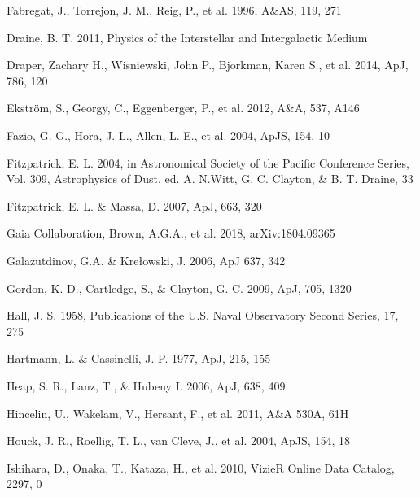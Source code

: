 \documentclass[tradiabstract]{aa} %
\begin{document}
\begin{thebibliography}{}
\item[] Fabregat, J., Torrejon, J. M., Reig, P., et al. 1996, A\&AS, 119, 271

\item[] Draine, B. T. 2011, Physics of the Interstellar and
  Intergalactic Medium

\item[] Draper, Zachary H., Wisniewski, John P., Bjorkman, Karen S., et al. 2014, ApJ, 786, 120

\item[] Ekstr\"om, S., Georgy, C., Eggenberger, P., et al. 2012, A\&A, 537, A146

\item[] Fazio, G. G., Hora, J. L., Allen, L. E., et al. 2004, ApJS, 154, 10

\item[] Fitzpatrick, E. L. 2004, in Astronomical Society of the
  Pacific Conference Series, Vol. 309, Astrophysics of Dust,
  ed. A. N.Witt, G. C. Clayton, \& B. T. Draine, 33

\item[] Fitzpatrick, E. L. \& Massa, D. 2007, ApJ, 663, 320
  
\item[] Gaia Collaboration, Brown, A.G.A., et al. 2018, arXiv:1804.09365

\item[] Galazutdinov, G.A. \& Kre{\l}owski, J. 2006,  ApJ 637,  342 
    
\item[] Gordon, K. D., Cartledge, S., \& Clayton, G. C. 2009, ApJ, 705, 1320

\item[] Hall, J. S. 1958, Publications of the U.S. Naval Observatory Second
Series, 17, 275

\item[] Hartmann, L. \& Cassinelli, J. P. 1977, ApJ, 215, 155

\item[] Heap, S. R., Lanz, T., \& Hubeny I. 2006, ApJ, 638, 409

\item[] Hincelin, U., Wakelam, V., Hersant, F., et al. 2011, A\&A 530A, 61H


\item[] Houck, J. R., Roellig, T. L., van Cleve, J., et al. 2004, ApJS, 154, 18

\item[] Ishihara, D., Onaka, T., Kataza, H., et al. 2010, VizieR Online Data
Catalog, 2297, 0


\end{thebibliography}
\end{document}
